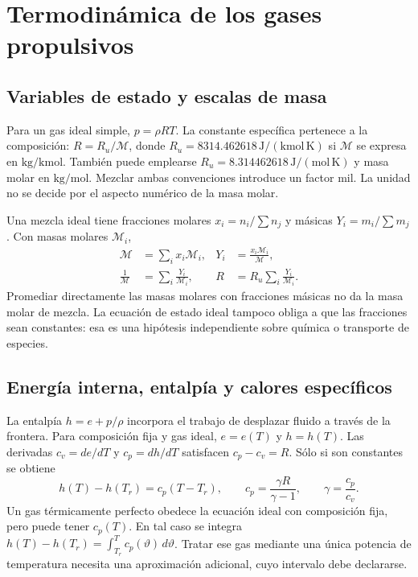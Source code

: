 \chapter{Termodinámica de los gases propulsivos}\label{ch:03}
\section{Variables de estado y escalas de masa}
Para un gas ideal simple, $p=\rho R T$. La constante específica pertenece a la composición: $R=R_u/\mathcal M$, donde $R_u=8314.462618\,\mathrm{J/(kmol\,K)}$ si $\mathcal M$ se expresa en $\mathrm{kg/kmol}$. También puede emplearse $R_u=8.314462618\,\mathrm{J/(mol\,K)}$ y masa molar en $\mathrm{kg/mol}$. Mezclar ambas convenciones introduce un factor mil. La unidad no se decide por el aspecto numérico de la masa molar.

Una mezcla ideal tiene fracciones molares $x_i=n_i/\sum n_j$ y másicas $Y_i=m_i/\sum m_j$. Con masas molares $\mathcal M_i$,
\begin{align}
\mathcal M&=\sum_i x_i\mathcal M_i,
&Y_i&=\frac{x_i\mathcal M_i}{\mathcal M},\\
\frac{1}{\mathcal M}&=\sum_i\frac{Y_i}{\mathcal M_i},
&R&=R_u\sum_i\frac{Y_i}{\mathcal M_i}.
\end{align}
Promediar directamente las masas molares con fracciones másicas no da la masa molar de mezcla. La ecuación de estado ideal tampoco obliga a que las fracciones sean constantes: esa es una hipótesis independiente sobre química o transporte de especies.
\section{Energía interna, entalpía y calores específicos}
La entalpía $h=e+p/\rho$ incorpora el trabajo de desplazar fluido a través de la frontera. Para composición fija y gas ideal, $e=e(T)$ y $h=h(T)$. Las derivadas $c_v=de/dT$ y $c_p=dh/dT$ satisfacen $c_p-c_v=R$. Sólo si son constantes se obtiene
\begin{equation}
 h(T)-h(T_r)=c_p(T-T_r),\qquad
 c_p=\frac{\gamma R}{\gamma-1},\qquad \gamma=\frac{c_p}{c_v}.
\end{equation}
Un gas térmicamente perfecto obedece la ecuación ideal con composición fija, pero puede tener $c_p(T)$. En tal caso se integra $h(T)-h(T_r)=\int_{T_r}^{T}c_p(\vartheta)\,d\vartheta$. Tratar ese gas mediante una única potencia de temperatura necesita una aproximación adicional, cuyo intervalo debe declararse.

